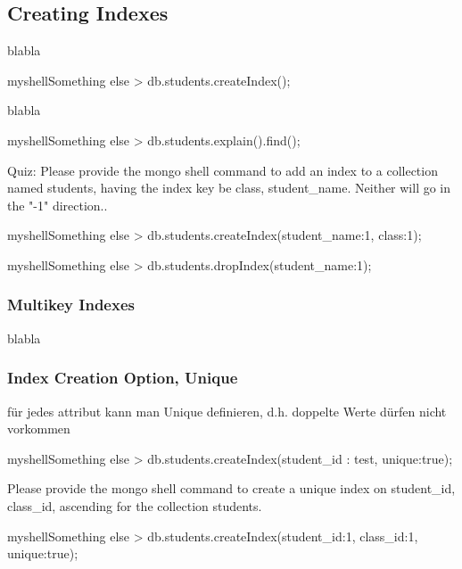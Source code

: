 \subsection{Creating Indexes}
blabla

\begin{listingsbox}[label={lst:X}]{myshell}{Something else}
> db.students.createIndex();
\end{listingsbox}

blabla

\begin{listingsbox}[label={lst:X}]{myshell}{Something else}
> db.students.explain().find();
\end{listingsbox}

Quiz: Please provide the mongo shell command to add an index to a collection named students, having the index key be class, student\_name.
Neither will go in the "-1" direction..

\begin{listingsbox}[label={lst:X}]{myshell}{Something else}
> db.students.createIndex({student\_name:1, class:1});
\end{listingsbox}

\begin{listingsbox}[label={lst:X}]{myshell}{Something else}
> db.students.dropIndex({student_name:1});
\end{listingsbox}

\subsubsection{Multikey Indexes}
blabla
\subsubsection{Index Creation Option, Unique}
für jedes attribut kann man Unique definieren, d.h. doppelte Werte dürfen nicht vorkommen\newline\newline

\begin{listingsbox}{myshell}{Something else}
> db.students.createIndex({student_id : test}, {unique:true});
\end{listingsbox}

Please provide the mongo shell command to create a unique index on student\_id, class\_id, ascending for the collection students.

\begin{listingsbox}[label={lst:X}]{myshell}{Something else}
> db.students.createIndex({student_id:1, class_id:1}, {unique:true});
\end{listingsbox}

